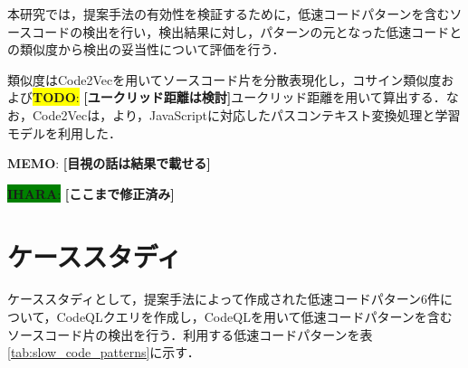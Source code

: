 \documentclass[submit,techrep,noauthor]{ipsj}
\newcommand{\todo}[1]{\colorbox{yellow}{{\bf TODO}:}{\color{red} {\textbf{[#1]}}}}
\newcommand{\memo}[1]{\colorbox{magenta!30}{{\bf MEMO}:}{\color{red!50} {\textbf{[#1]}}}}
\newcommand{\ihara}[1]{\colorbox{green}{{\bf IHARA}:}{\color{blue} {\textbf{[#1]}}}}
\begin{document}
本研究では，提案手法の有効性を検証するために，低速コードパターンを含むソースコードの検出を行い，検出結果に対し，パターンの元となった低速コードとの類似度から検出の妥当性について評価を行う．

類似度はCode2Vec\cite{code2vec}を用いてソースコード片を分散表現化し，コサイン類似度および\todo{ユークリッド距離は検討}ユークリッド距離を用いて算出する．なお，Code2Vecは，\cite{saiki}より，JavaScriptに対応したパスコンテキスト変換処理と学習モデルを利用した．

\memo{目視の話は結果で載せる}


\ihara{ここまで修正済み}

\section{ケーススタディ}
\label{sec:case-study}

ケーススタディとして，提案手法によって作成された低速コードパターン6件について，CodeQLクエリを作成し，CodeQLを用いて低速コードパターンを含むソースコード片の検出を行う．利用する低速コードパターンを表\ref{tab:slow_code_patterns}に示す．
\end{document}
